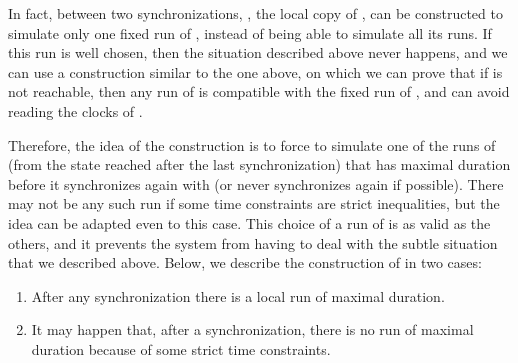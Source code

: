 \documentclass{LMCS}
\theoremstyle{plain}\newtheorem*{prop11}{Proposition~\ref{prop:states} bis}
\begin{document}
In fact, between two synchronizations,
, the local copy of , can be constructed to simulate
only one fixed run of , instead of being able to simulate all its runs.
If this run is well chosen, then the situation described above never happens,
and we can use a construction similar to the one above, on which we can prove that
if  is not reachable, then any run of  is compatible with the
fixed run of , and  can avoid reading the clocks of .

Therefore, the idea of the construction is to force  to simulate one
of the runs of  (from the state reached after
the last synchronization) that has maximal duration before it synchronizes again
with  (or never synchronizes again if
possible). There may not be any
  such run if some time constraints are strict inequalities, but the idea can be
  adapted even to this case.
This choice of a run of  is as valid as the others, and it
prevents the system from having to deal with the subtle situation that we described
above.
Below, we describe the construction of  in two cases:
\begin{enumerate}
  \item After any synchronization there is a local run of maximal duration.
  \item It may happen that, after a synchronization, there is no
    run of maximal duration because of some strict time constraints.
\end{enumerate}
\end{document}
